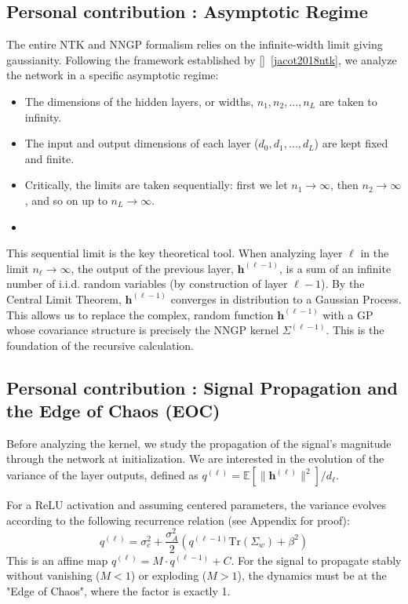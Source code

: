 \documentclass[11pt]{article}
\begin{document}
\subsection{Personal contribution : Asymptotic Regime}
The entire NTK and NNGP formalism relies on the infinite-width limit giving gaussianity. Following the framework established by []~\ref{jacot2018ntk}, we analyze the network in a specific asymptotic regime:
\begin{itemize}
    \item The dimensions of the hidden layers, or widths, $n_1, n_2, \dots, n_L$ are taken to infinity.
    \item The input and output dimensions of each layer ($d_0, d_1, \dots, d_L$) are kept fixed and finite.
    \item Critically, the limits are taken sequentially: first we let $n_1 \to \infty$, then $n_2 \to \infty$, and so on up to $n_L \to \infty$.
    \item 
\end{itemize}
\begin{tcolorbox}[colback=green!5,colframe=green!80!black,title={\textbf{Remark: Sequential Limit as Key Theoretical Tool}},enhanced,drop shadow,boxrule=2pt]
This sequential limit is the key theoretical tool. When analyzing layer $\ell$ in the limit $n_\ell \to \infty$, the output of the previous layer, $\bm{h}^{(\ell-1)}$, is a sum of an infinite number of i.i.d. random variables (by construction of layer $\ell-1$). By the Central Limit Theorem, $\bm{h}^{(\ell-1)}$ converges in distribution to a Gaussian Process. This allows us to replace the complex, random function $\bm{h}^{(\ell-1)}$ with a GP whose covariance structure is precisely the NNGP kernel $\Sigma^{(\ell-1)}$. This is the foundation of the recursive calculation.
\end{tcolorbox}

\subsection{Personal contribution : Signal Propagation and the Edge of Chaos (EOC)}
Before analyzing the kernel, we study the propagation of the signal's magnitude through the network at initialization. We are interested in the evolution of the variance of the layer outputs, defined as $q^{(\ell)} = \mathbb{E}[\|\bm{h}^{(\ell)}\|^2]/d_\ell$.

For a ReLU activation and assuming centered parameters, the variance evolves according to the following recurrence relation (see Appendix for proof):
\begin{equation}
    q^{(\ell)} = \sigma_c^2 + \frac{\sigma_A^2}{2} \left( q^{(\ell-1)}\text{Tr}(\Sigma_w) + \beta^2 \right)
\end{equation}
This is an affine map $q^{(\ell)} = M \cdot q^{(\ell-1)} + C$. For the signal to propagate stably without vanishing ($M<1$) or exploding ($M>1$), the dynamics must be at the "Edge of Chaos", where the factor is exactly 1.
\end{document}
